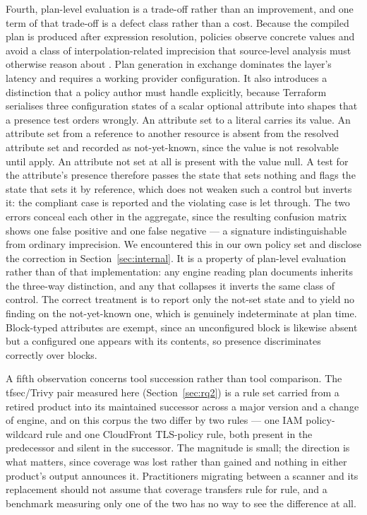\documentclass[smallextended]{svjour3}
\begin{document}
Fourth, plan-level evaluation is a trade-off rather than an improvement, and one
term of that trade-off is a defect class rather than a cost. Because the compiled
plan is produced after expression resolution, policies observe concrete values
and avoid a class of interpolation-related imprecision that source-level analysis
must otherwise reason about \citep{opdebeeck2023control}. Plan generation in
exchange dominates the layer's latency and requires a working provider
configuration. It also introduces a distinction that a policy author must handle
explicitly, because Terraform serialises three configuration states of a scalar
optional attribute into shapes that a presence test orders wrongly. An attribute
set to a literal carries its value. An attribute set from a reference to another
resource is absent from the resolved attribute set and recorded as not-yet-known,
since the value is not resolvable until apply. An attribute not set at all is
present with the value null. A test for the attribute's presence therefore passes
the state that sets nothing and flags the state that sets it by reference, which
does not weaken such a control but inverts it: the compliant case is reported and
the violating case is let through. The two errors conceal each other in the
aggregate, since the resulting confusion matrix shows one false positive and one
false negative --- a signature indistinguishable from ordinary imprecision. We
encountered this in our own policy set and disclose the correction in
Section~\ref{sec:internal}. It is a property of plan-level evaluation rather than
of that implementation: any engine reading plan documents inherits the three-way
distinction, and any that collapses it inverts the same class of control. The
correct treatment is to report only the not-set state and to yield no finding on
the not-yet-known one, which is genuinely indeterminate at plan time. Block-typed
attributes are exempt, since an unconfigured block is likewise absent but a
configured one appears with its contents, so presence discriminates correctly
over blocks.

A fifth observation concerns tool succession rather than tool comparison. The
tfsec/Trivy pair measured here (Section~\ref{sec:rq2}) is a rule set carried from
a retired product into its maintained successor across a major version and a
change of engine, and on this corpus the two differ by two rules --- one IAM
policy-wildcard rule and one CloudFront TLS-policy rule, both present in the
predecessor and silent in the successor. The magnitude is small; the direction is
what matters, since coverage was lost rather than gained and nothing in either
product's output announces it. Practitioners migrating between a scanner and its
replacement should not assume that coverage transfers rule for rule, and a
benchmark measuring only one of the two has no way to see the difference at all.
\end{document}

